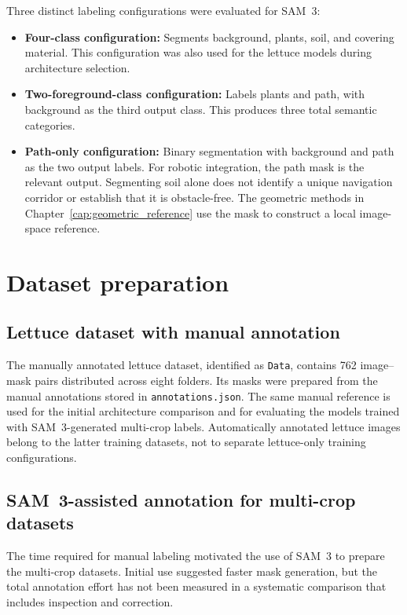 Three distinct labeling configurations were evaluated for SAM~3:
\begin{itemize}
\item \textbf{Four-class configuration:} Segments background, plants, soil, and covering material. This configuration was also used for the lettuce models during architecture selection.
\item \textbf{Two-foreground-class configuration:} Labels plants and path, with background as the third output class. This produces three total semantic categories.
\item \textbf{Path-only configuration:} Binary segmentation with background and path as the two output labels. For robotic integration, the path mask is the relevant output. Segmenting soil alone does not identify a unique navigation corridor or establish that it is obstacle-free. The geometric methods in Chapter~\ref{cap:geometric_reference} use the mask to construct a local image-space reference.
\end{itemize}

\section{Dataset preparation}
\label{sec:c4_datasets}

\subsection{Lettuce dataset with manual annotation}
\label{subsec:c4_lettuce}

The manually annotated lettuce dataset, identified as \texttt{Data},
contains 762 image--mask pairs distributed across eight folders. Its
masks were prepared from the manual annotations stored in
\texttt{annotations.json}. The same manual reference is used for the
initial architecture comparison and for evaluating the models trained
with SAM~3-generated multi-crop labels. Automatically annotated lettuce
images belong to the latter training datasets, not to separate
lettuce-only training configurations.

\subsection{SAM~3-assisted annotation for multi-crop datasets}
\label{subsec:c4_sam_annotation}

The time required for manual labeling motivated the use of SAM~3 to
prepare the multi-crop datasets. Initial use suggested faster mask
generation, but the total annotation effort has not been measured in a
systematic comparison that includes inspection and correction.

